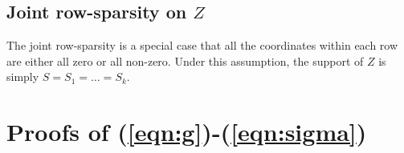 \documentclass[pdftex]{imsart}
\theoremstyle{plain}
\begin{document}


\subsection{Joint row-sparsity on $Z$} 

The joint row-sparsity is a special case that all the coordinates within each row are either all zero or all non-zero. Under this assumption, the support of $Z$ is simply $S = S_1 = \dots = S_k$. 

\appendix

\section{Proofs of (\ref{eqn:g})-(\ref{eqn:sigma})}
\label{derive-cavi}
\end{document}
